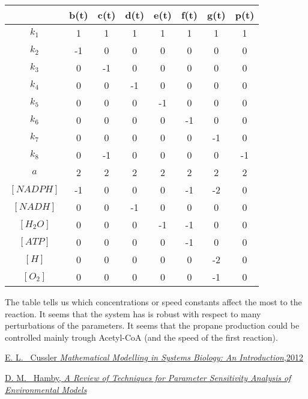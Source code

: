 \documentclass[12pt]{article}
\begin{document}
\begin{tabular} {|c | c|c|c|c|c|c|c|}
\hline
& b(t) & c(t) & d(t) & e(t) & f(t) & g(t) & p(t) \\
\hline
$k_1$ & 1 & 1 & 1 & 1 & 1 & 1 & 1 \\
\hline
$k_2$ & -1 & 0 & 0 & 0 & 0 & 0 & 0 \\
\hline
$k_3$ & 0 & -1 & 0 & 0 & 0 & 0 & 0 \\
\hline
$k_4$ & 0 & 0 & -1 & 0 & 0 & 0 & 0 \\
\hline
$k_5$ & 0 & 0 & 0 & -1 & 0 & 0 & 0 \\
\hline
$k_6$ & 0 & 0 & 0 & 0 & -1 & 0 & 0 \\
\hline
$k_7$ & 0 & 0 & 0 & 0 & 0 & -1 & 0 \\
\hline
$k_8$ & 0 & -1 & 0 & 0 & 0 & 0 & -1 \\
\hline
$a$ & 2 & 2 & 2 & 2 & 2 & 2 & 2 \\
\hline
$[NADPH]$ & -1 & 0 & 0 & 0 & -1 & -2 & 0\\
\hline
$[NADH]$ & 0 & 0 & -1 & 0 & 0 & 0 & 0\\
\hline
$[H_2O]$ & 0 & 0 & 0 & -1 & -1 & 0 & 0\\
\hline
$[ATP]$ & 0 & 0 & 0 & 0 & -1 & 0 & 0\\
\hline
$[H]$ & 0 & 0 & 0 & 0 & 0 & -2 & 0\\
\hline
$[O_2]$ & 0 & 0 & 0 & 0 & 0 & -1 & 0\\
\hline
\end{tabular}

\bigskip

The table tells us which concentrations or speed constants affect the most to the reaction. It seems that the system has is robust with respect to many perturbations of the parameters. It seems that the propane production could be controlled mainly trough Acetyl-CoA (and the speed of the first reaction).

\begin{thebibliography}{99}
{\href{http://www.math.uwaterloo.ca/~bingalls/MMSB/Notes.pdf}{{\sc E. L. ~Cussler} {\em Mathematical Modelling in Systems Biology:  An Introduction},2012}}

{\href{http://citeseerx.ist.psu.edu/viewdoc/download?doi=10.1.1.224.7813&rep=rep1&type=pdf}{{\sc D. M. ~Hamby}, {\em A Review of Techniques for Parameter Sensitivity Analysis of Environmental Models}}}

\end{thebibliography}
\end{document}
